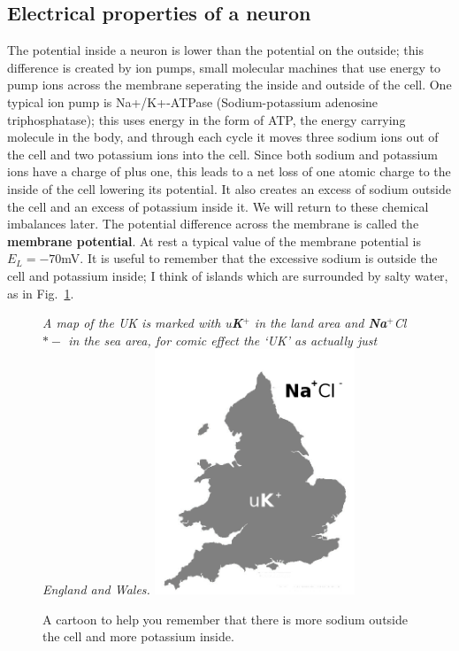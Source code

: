 \documentclass[12pt]{article}
\begin{document}
\subsection*{Electrical properties of a neuron}
The potential inside a neuron is lower than the potential on the
outside; this difference is created by ion pumps, small molecular
machines that use energy to pump ions across the membrane seperating
the inside and outside of the cell. One typical ion pump is
Na+/K+-ATPase (Sodium-potassium adenosine triphosphatase); this uses
energy in the form of ATP, the energy carrying molecule in the body,
and through each cycle it moves three sodium ions out of the cell and
two potassium ions into the cell. Since both sodium and potassium ions
have a charge of plus one, this leads to a net loss of one atomic
charge to the inside of the cell lowering its potential. It also
creates an excess of sodium outside the cell and an excess of
potassium inside it. We will return to these chemical imbalances
later. The potential difference across the membrane is called the
\textbf{membrane potential}. At rest a typical value of the membrane
potential is $E_L=-70 $mV. It is useful to remember that the excessive
sodium is outside the cell and potassium inside; I think of islands
which are surrounded by salty water, as in Fig.~\ref{in_out}.


\begin{figure}
  \begin{center}
    {\textsl{A map of the UK is marked with u\textbf{K}$^+$ in the land area and \textbf{Na}$^+$Cl$*-$ in the sea area, for comic effect the `UK' as actually just England and Wales.} 
}
    {      \includegraphics[width=6cm]{in_out_future}
      }
\end{center}
\caption{A cartoon to help you remember that there is more sodium outside the cell and more potassium inside.\label{in_out}}
\end{figure}
\end{document}
